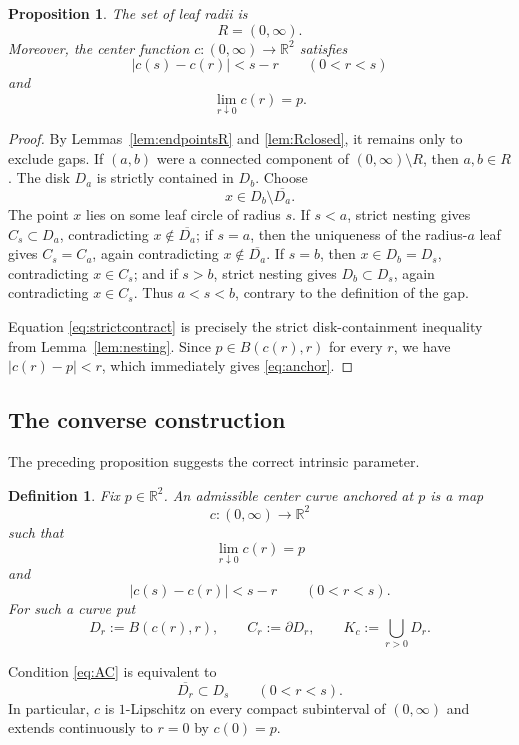 \documentclass[11pt]{article}
\newtheorem{proposition}[theorem]{Proposition}
\newtheorem{definition}[theorem]{Definition}
\newcommand{\R}{\mathbb{R}}
\newcommand{\ol}{\overline}
\begin{document}
\begin{proposition}\label{prop:Rall}
The set of leaf radii is
\[
R=(0,\infty).
\]
Moreover, the center function $c:(0,\infty)\to\R^2$ satisfies
\[
|c(s)-c(r)|<s-r\qquad(0<r<s)
\tag{4.1}\label{eq:strictcontract}
\]
and
\[
\lim_{r\downarrow0}c(r)=p.
\tag{4.2}\label{eq:anchor}
\]
\end{proposition}

\begin{proof}
By Lemmas~\ref{lem:endpointsR} and \ref{lem:Rclosed}, it remains only to exclude gaps. If $(a,b)$ were a connected component of $(0,\infty)\setminus R$, then $a,b\in R$. The disk $D_a$ is strictly contained in $D_b$. Choose
\[
x\in D_b\setminus\ol{D_a}.
\]
The point $x$ lies on some leaf circle of radius $s$. If $s<a$, strict nesting gives $C_s\subset D_a$, contradicting $x\notin\ol{D_a}$; if $s=a$, then the uniqueness of the radius-$a$ leaf gives $C_s=C_a$, again contradicting $x\notin\ol{D_a}$. If $s=b$, then $x\in D_b=D_s$, contradicting $x\in C_s$; and if $s>b$, strict nesting gives $D_b\subset D_s$, again contradicting $x\in C_s$. Thus $a<s<b$, contrary to the definition of the gap.

Equation \eqref{eq:strictcontract} is precisely the strict disk-containment inequality from Lemma~\ref{lem:nesting}. Since $p\in B(c(r),r)$ for every $r$, we have $|c(r)-p|<r$, which immediately gives \eqref{eq:anchor}.
\end{proof}

\subsection{The converse construction}

The preceding proposition suggests the correct intrinsic parameter.

\begin{definition}\label{def:admissible}
Fix $p\in\R^2$. An \emph{admissible center curve anchored at $p$} is a map
\[
c:(0,\infty)\to\R^2
\]
such that
\[
\lim_{r\downarrow0}c(r)=p
\]
and
\[
|c(s)-c(r)|<s-r\qquad(0<r<s).
\tag{4.3}\label{eq:AC}
\]
For such a curve put
\[
D_r:=B(c(r),r),\qquad C_r:=\partial D_r,
\qquad
K_c:=\bigcup_{r>0}D_r.
\]
\end{definition}

Condition \eqref{eq:AC} is equivalent to
\[
\ol{D_r}\subset D_s\qquad(0<r<s).
\tag{4.4}\label{eq:nest}
\]
In particular, $c$ is $1$-Lipschitz on every compact subinterval of $(0,\infty)$ and extends continuously to $r=0$ by $c(0)=p$.
\end{document}
